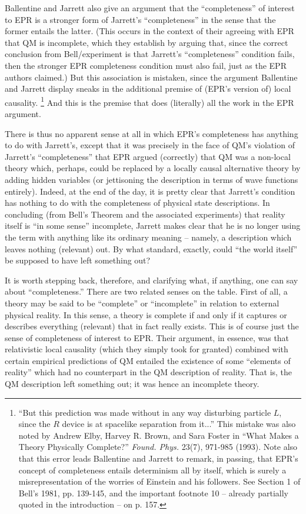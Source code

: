 \documentclass[aps,prc,twocolumn]{revtex4}
\begin{document}
Ballentine and Jarrett also give an argument that the ``completeness''
of interest to EPR is a stronger form of Jarrett's ``completeness'' in
the sense that the former entails the latter.  (This occurs in the
context of their agreeing with EPR that QM is incomplete, which they
establish by arguing that, since the correct conclusion from
Bell/experiment is that Jarrett's ``completeness'' condition fails,
then the stronger EPR completeness condition must also fail, just as the
EPR authors claimed.)  But this association is mistaken, since
the argument Ballentine and Jarrett display sneaks in the additional
premise of (EPR's version of) local causality.  \footnote{``But this
  prediction was made without in any way disturbing particle $L$,
  since the $R$ device is at spacelike separation from it...''  This
  mistake was also noted by Andrew Elby, Harvey R. Brown, and Sara
  Foster in ``What Makes a Theory Physically Complete?''
  \emph{Found. Phys.} 23(7),  971-985 (1993).  Note
  also that this error leads Ballentine and Jarrett to remark, in
  passing, that EPR's concept of completeness entails determinism all
  by itself, which is surely a misrepresentation of the worries of
  Einstein and his followers.  See Section 1 of Bell's 1981,
  pp. 139-145, and the important footnote 10 -- already partially
  quoted in the introduction -- on p. 157.}
And this is the premise that does (literally) 
all the work in the EPR argument.  

There is thus no apparent sense at all in which EPR's completeness
has anything to do with Jarrett's, except that it was precisely in
the face of QM's violation of Jarrett's ``completeness'' that EPR
argued (correctly) that QM was a non-local theory which, perhaps, could be
replaced by a locally causal alternative theory by adding hidden
variables (or jettisoning the description in terms of wave functions
entirely).  Indeed, at the end of the day, it is pretty clear that 
Jarrett's condition has nothing to do with the completeness of physical
state descriptions.  In concluding (from Bell's Theorem and the
associated experiments) that reality itself is ``in some sense''
incomplete, Jarrett makes clear that he is no longer using the term
with anything like its ordinary meaning -- namely, a description which 
leaves nothing (relevant) out.  By what standard, exactly, could
``the world itself'' be supposed to have left something out?  

It is worth stepping back, therefore, and clarifying what, if 
anything, one can say about ``completeness.''
There are two related senses on the table.  First of all, a theory may
be said to be ``complete'' or ``incomplete'' in relation to external
physical reality.  In this sense, a theory is complete if and only if
it captures or describes everything (relevant) that in fact really
exists.  This is of course just the sense of completeness of interest
to EPR.  Their argument, in essence, was that relativistic local
causality (which they simply took for granted) combined with certain
empirical predictions of QM entailed the existence
of some ``elements of reality'' which had no counterpart in the QM
description of reality.  That is, the QM description left something out;
it was hence
an incomplete theory.  
\end{document}
